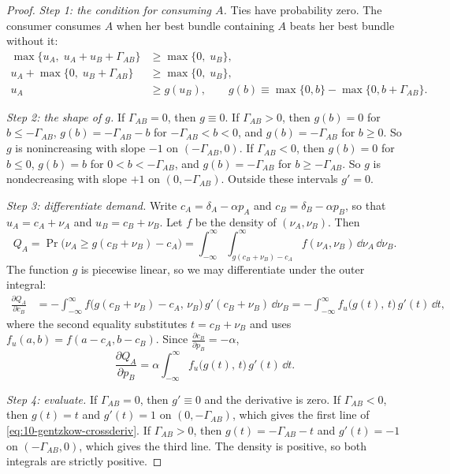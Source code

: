 \begin{proof}
\textit{Step 1: the condition for consuming $A$.} Ties have probability zero. The consumer consumes $A$ when her best
bundle containing $A$ beats her best bundle without it:
\begin{align*}
  \max\{u_A,\; u_A + u_B + \Gamma_{AB}\} &\ge \max\{0,\; u_B\}, \\
  u_A + \max\{0,\; u_B + \Gamma_{AB}\} &\ge \max\{0,\; u_B\}, \\
  u_A &\ge g(u_B), \qquad g(b) \equiv \max\{0, b\} - \max\{0, b + \Gamma_{AB}\} .
\end{align*}

\textit{Step 2: the shape of $g$.} If $\Gamma_{AB} = 0$, then $g \equiv 0$. If $\Gamma_{AB} > 0$, then $g(b) = 0$ for $b
\le -\Gamma_{AB}$, $g(b) = -\Gamma_{AB} - b$ for $-\Gamma_{AB} < b < 0$, and $g(b) = -\Gamma_{AB}$ for $b \ge 0$. So $g$ is
nonincreasing with slope $-1$ on $(-\Gamma_{AB}, 0)$. If $\Gamma_{AB} < 0$, then $g(b) = 0$ for $b \le 0$, $g(b) = b$ for
$0 < b < -\Gamma_{AB}$, and $g(b) = -\Gamma_{AB}$ for $b \ge -\Gamma_{AB}$. So $g$ is nondecreasing with slope $+1$ on
$(0, -\Gamma_{AB})$. Outside these intervals $g' = 0$.

\textit{Step 3: differentiate demand.} Write $c_A = \delta_A - \alpha p_A$ and $c_B = \delta_B - \alpha p_B$, so that
$u_A = c_A + \nu_A$ and $u_B = c_B + \nu_B$. Let $f$ be the density of $(\nu_A, \nu_B)$. Then
\begin{equation*}
  Q_A = \Pr\bigl(\nu_A \ge g(c_B + \nu_B) - c_A\bigr)
      = \int_{-\infty}^{\infty}\int_{g(c_B + \nu_B) - c_A}^{\infty} f(\nu_A, \nu_B)\,\dd\nu_A\,\dd\nu_B .
\end{equation*}
The function $g$ is piecewise linear, so we may differentiate under the outer integral:
\begin{align*}
  \frac{\partial Q_A}{\partial c_B} &= -\int_{-\infty}^{\infty} f\bigl(g(c_B + \nu_B) - c_A,\, \nu_B\bigr)\,
         g'(c_B + \nu_B)\,\dd\nu_B
      = -\int_{-\infty}^{\infty} f_u\bigl(g(t),\, t\bigr)\, g'(t)\,\dd t ,
\end{align*}
where the second equality substitutes $t = c_B + \nu_B$ and uses $f_u(a,b) = f(a - c_A, b - c_B)$. Since $\frac{\partial
c_B}{\partial p_B} = -\alpha$,
\begin{equation*}
  \frac{\partial Q_A}{\partial p_B} = \alpha\int_{-\infty}^{\infty} f_u\bigl(g(t),\, t\bigr)\, g'(t)\,\dd t .
\end{equation*}

\textit{Step 4: evaluate.} If $\Gamma_{AB} = 0$, then $g' \equiv 0$ and the derivative is zero. If $\Gamma_{AB} < 0$, then
$g(t) = t$ and $g'(t) = 1$ on $(0, -\Gamma_{AB})$, which gives the first line of \eqref{eq:10-gentzkow-crossderiv}. If
$\Gamma_{AB} > 0$, then $g(t) = -\Gamma_{AB} - t$ and $g'(t) = -1$ on $(-\Gamma_{AB}, 0)$, which gives the third line.
The density is positive, so both integrals are strictly positive.
\end{proof}

